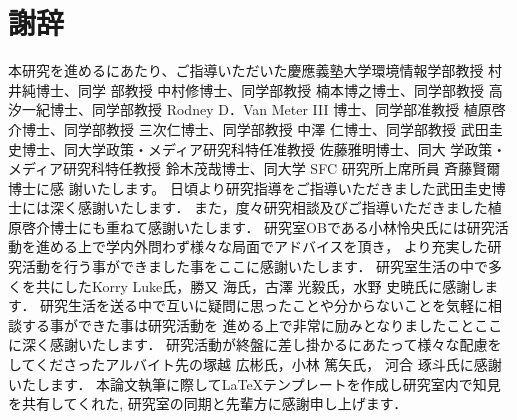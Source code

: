 \chapter*{謝辞}
\label{thanks}
本研究を進めるにあたり、ご指導いただいた慶應義塾大学環境情報学部教授 村井純博士、同学
部教授 中村修博士、同学部教授 楠本博之博士、同学部教授 高汐一紀博士、同学部教授 Rodney
D．Van Meter III 博士、同学部准教授 植原啓介博士、同学部教授 三次仁博士、同学部教授 中澤
仁博士、同学部教授 武田圭史博士、同大学政策・メディア研究科特任准教授 佐藤雅明博士、同大
学政策・メディア研究科特任教授 鈴木茂哉博士、同大学 SFC 研究所上席所員 斉藤賢爾博士に感
謝いたします。
日頃より研究指導をご指導いただきました武田圭史博士には深く感謝いたします．
また，度々研究相談及びご指導いただきました植原啓介博士にも重ねて感謝いたします．
研究室OBである小林怜央氏には研究活動を進める上で学内外問わず様々な局面でアドバイスを頂き，
より充実した研究活動を行う事ができました事をここに感謝いたします．
研究室生活の中で多くを共にしたKorry Luke氏，勝又 海氏，古澤 光毅氏，水野 史暁氏に感謝します．
研究生活を送る中で互いに疑問に思ったことや分からないことを気軽に相談する事ができた事は研究活動を
進める上で非常に励みとなりましたことここに深く感謝いたします．
研究活動が終盤に差し掛かるにあたって様々な配慮をしてくださったアルバイト先の塚越 広彬氏，小林 篤矢氏，
河合 琢斗氏に感謝いたします．
本論文執筆に際して\LaTeX テンプレートを作成し研究室内で知見を共有してくれた,
研究室の同期と先輩方に感謝申し上げます．


